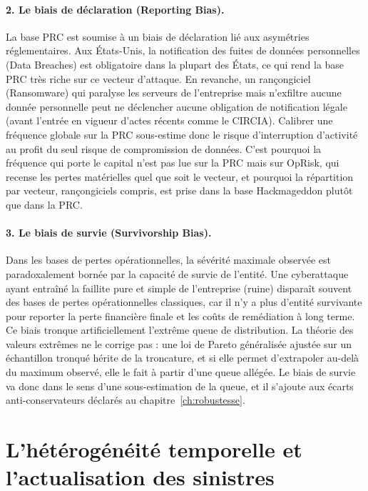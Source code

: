 \paragraph{2. Le biais de déclaration (Reporting Bias).}
La base PRC est soumise à un biais de déclaration lié aux asymétries réglementaires. Aux États-Unis, la notification des fuites de données personnelles (Data Breaches) est obligatoire dans la plupart des États, ce qui rend la base PRC très riche sur ce vecteur d'attaque. En revanche, un rançongiciel (Ransomware) qui paralyse les serveurs de l'entreprise mais n'exfiltre aucune donnée personnelle peut ne déclencher aucune obligation de notification légale (avant l'entrée en vigueur d'actes récents comme le CIRCIA).
Calibrer une fréquence globale sur la PRC sous-estime donc le risque d'interruption
d'activité au profit du seul risque de compromission de données. C'est pourquoi la fréquence
qui porte le capital n'est pas lue sur la PRC mais sur OpRisk, qui recense les pertes matérielles
quel que soit le vecteur, et pourquoi la répartition par vecteur, rançongiciels compris, est prise
dans la base Hackmageddon plutôt que dans la PRC.

\paragraph{3. Le biais de survie (Survivorship Bias).}
Dans les bases de pertes opérationnelles, la sévérité maximale observée est paradoxalement bornée par la capacité de survie de l'entité. Une cyberattaque ayant entraîné la faillite pure et simple de l'entreprise (ruine) disparaît souvent des bases de pertes opérationnelles classiques, car il n'y a plus d'entité survivante pour reporter la perte financière finale et les coûts de remédiation à long terme. Ce biais tronque artificiellement l'extrême queue de distribution. La théorie des valeurs
extrêmes ne le corrige pas : une loi de Pareto généralisée ajustée sur un échantillon tronqué
hérite de la troncature, et si elle permet d'extrapoler au-delà du maximum observé, elle le fait
à partir d'une queue allégée. Le biais de survie va donc dans le sens d'une sous-estimation de la
queue, et il s'ajoute aux écarts anti-conservateurs déclarés au chapitre~\ref{ch:robustesse}.



\section{L'hétérogénéité temporelle et l'actualisation des sinistres}

